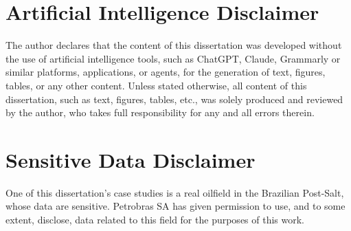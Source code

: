 \documentclass[
    oneside, %
    sumario=tradicional, %
    idioma=english, %
    bib=alf, %
    refback, %
    numb=chap, %
]{unbtex}
\begin{document}
\pretextual

\imprimircapa 

\imprimirfolhaderosto*

\fichacatalografica

\imprimirfolhadeaprovacao

\imprimirdedicatoria

\imprimiragradecimentos

\imprimirepigrafe

\chapter*{Artificial Intelligence Disclaimer}
    The author declares that the content of this dissertation 
    was developed without the use of artificial intelligence tools, 
    such as ChatGPT, Claude, Grammarly or similar platforms, applications, or agents,
    for the generation of text, figures, tables, or any other content.
    Unless stated otherwise, all content of this dissertation, 
    such as text, figures, tables, etc., 
    was solely produced and reviewed by the author,
    who takes full responsibility for any and all errors therein.

\chapter*{Sensitive Data Disclaimer}
    One of this dissertation's case studies is a real oilfield in the Brazilian Post-Salt, whose data are sensitive.
    Petrobras SA has given permission to use, and to some extent, disclose, data related to this field for the purposes of this work.
\cleardoublepage

\imprimirresumos

\imprimirlistadefiguras


\imprimirlistadetabelas
\end{document}
